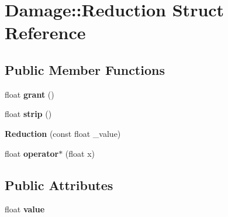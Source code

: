 \hypertarget{struct_damage_1_1_reduction}{}\section{Damage\+:\+:Reduction Struct Reference}
\label{struct_damage_1_1_reduction}
\subsection*{Public Member Functions}
\begin{DoxyCompactItemize}
\item 
\hypertarget{struct_damage_1_1_reduction_aa7f0b5e96bf553f45c6fcd9570425c32}{}float {\bfseries grant} ()\label{struct_damage_1_1_reduction_aa7f0b5e96bf553f45c6fcd9570425c32}

\item 
\hypertarget{struct_damage_1_1_reduction_ac40456ba67edd30f3e950da25b5be3a1}{}float {\bfseries strip} ()\label{struct_damage_1_1_reduction_ac40456ba67edd30f3e950da25b5be3a1}

\item 
\hypertarget{struct_damage_1_1_reduction_a779817b48e6d73ba372f7921a2e2af66}{}{\bfseries Reduction} (const float \+\_\+value)\label{struct_damage_1_1_reduction_a779817b48e6d73ba372f7921a2e2af66}

\item 
\hypertarget{struct_damage_1_1_reduction_a92308be41522beb4ca5466a7975a198a}{}float {\bfseries operator$\ast$} (float x)\label{struct_damage_1_1_reduction_a92308be41522beb4ca5466a7975a198a}

\end{DoxyCompactItemize}
\subsection*{Public Attributes}
\begin{DoxyCompactItemize}
\item 
\hypertarget{struct_damage_1_1_reduction_a2c5177a2bfce39ab27f6154cf0940c93}{}float {\bfseries value}\label{struct_damage_1_1_reduction_a2c5177a2bfce39ab27f6154cf0940c93}

\end{DoxyCompactItemize}
